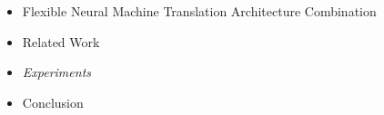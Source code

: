 \begin{frame}

\begin{itemize}
    \item Flexible Neural Machine Translation Architecture Combination
    \item Related Work
    \item \emph{\color{UOYellow}Experiments}
    \item Conclusion
\end{itemize}

\end{frame}
